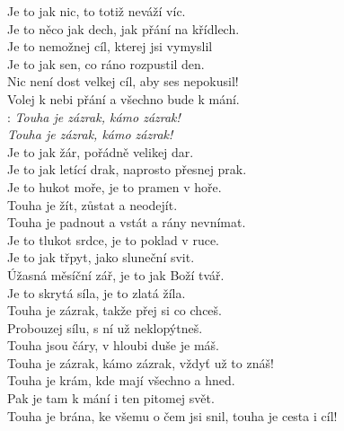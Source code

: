 
\begin{Large}

Je to jak nic, to totiž neváží víc.\\
Je to něco jak dech, jak přání na křídlech.\\
Je to nemožnej cíl, kterej jsi vymyslil\\

Je to jak sen, co ráno rozpustil den.\\
Nic není dost velkej cíl, aby ses nepokusil!\\
Volej k nebi přání a všechno bude k mání.\\

\textregistered: \emph{Touha je zázrak, kámo zázrak!\\
Touha je zázrak, kámo zázrak!}\\

Je to jak žár, pořádně velikej dar.\\
Je to jak letící drak, naprosto přesnej prak.\\
Je to hukot moře, je to pramen v hoře.\\

Touha je žít, zůstat a neodejít.\\
Touha je padnout a vstát a rány nevnímat.\\
Je to tlukot srdce, je to poklad v ruce.\\

Je to jak třpyt, jako sluneční svit.\\
Úžasná měsíční zář, je to jak Boží tvář.\\
Je to skrytá síla, je to zlatá žíla.\\

Touha je zázrak, takže přej si co chceš.\\
Probouzej sílu, s ní už neklopýtneš.\\
Touha jsou čáry, v hloubi duše je máš.\\
Touha je zázrak, kámo zázrak, vždyť už to znáš!\\

Touha je krám, kde mají všechno a hned.\\
Pak je tam k mání i ten pitomej svět.\\
Touha je brána, ke všemu o čem jsi snil, touha je cesta i cíl!\\

\textregistered
\end{Large}

\newpage
